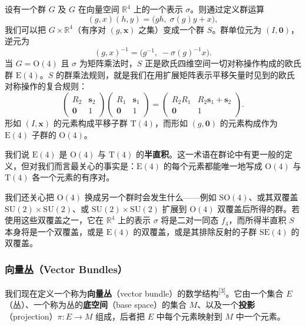 设有一个群 $G$ 及 $G$ 在向量空间 $\mathbb{R}^4$ 上的一个表示 $\sigma$。则通过定义群运算
\[
(g,x)(h,y)=\big(gh,\;\sigma(g)y+x\big),
\]
我们可以把 $G\times\mathbb{R}^4$（有序对 $(g,\mathbf{x})$ 之集）变成一个群 $S$。群单位元为 $(I,\mathbf{0})$，逆元为
\[
(g,x)^{-1}=\big(g^{-1},\;-\sigma(g)^{-1}x\big).
\]
当 $G=\mathrm{O}(4)$ 且 $\sigma$ 为矩阵乘法时，$S$ 正是欧氏四维空间一切对称操作构成的欧氏群 $\mathrm{E}(4)$。$S$ 的群乘法规则，就是我们在用扩展矩阵表示平移矢量时见到的欧氏对称操作的复合规则：
\[
\begin{pmatrix}R_2 & \mathbf{s}_2\\ \mathbf{0} & 1\end{pmatrix}
\begin{pmatrix}R_1 & \mathbf{s}_1\\ \mathbf{0} & 1\end{pmatrix}
=
\begin{pmatrix}R_2 R_1 & R_2\mathbf{s}_1+\mathbf{s}_2\\ \mathbf{0} & 1\end{pmatrix}.
\]
形如 $(I,\mathbf{x})$ 的元素构成平移子群 $\mathrm{T}(4)$，而形如 $(g,\mathbf{0})$ 的元素构成作为 $\mathrm{E}(4)$ 子群的 $\mathrm{O}(4)$。

我们说 $\mathrm{E}(4)$ 是 $\mathrm{O}(4)$ 与 $\mathrm{T}(4)$ 的\textbf{半直积}。这一术语在群论中有更一般的定义，但对我们而言最关心的事实是：$\mathrm{E}(4)$ 的每个元素都能唯一地写成 $\mathrm{O}(4)$ 与 $\mathrm{T}(4)$ 各一个元素的有序对。

我们还关心把 $\mathrm{O}(4)$ 换成另一个群时会发生什么——例如 $\mathrm{SO}(4)$、或其双覆盖 $\mathrm{SU}(2)\times\mathrm{SU}(2)$、或 $\mathrm{SU}(2)\times\mathrm{SU}(2)$ 扩展到 $\mathrm{O}(4)$ 双覆盖后所得的群。若使用这些双覆盖之一，它在 $\mathbb{R}^4$ 上的表示 $\sigma$ 将是二对一同态 $f_4$，而所得半直积 $S$ 本身将是一个双覆盖，或是 $\mathrm{E}(4)$ 的双覆盖，或是其排除反射的子群 $\mathrm{SE}(4)$ 的双覆盖。

\subsubsection{向量丛（Vector Bundles）}

我们现在定义一个称为\textbf{向量丛}（vector bundle）的数学结构\textsuperscript{[3]}。它由一个集合 $E$（丛）、一个称为丛的\textbf{底空间}（base space）的集合 $M$、以及一个\textbf{投影}（projection）$\pi:E\to M$ 组成，后者把 $E$ 中每个元素映射到 $M$ 中一个元素。


